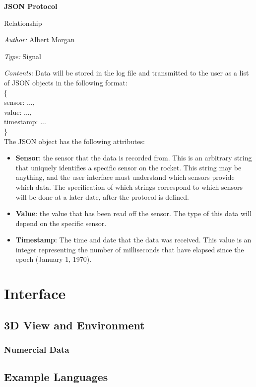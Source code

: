 \documentclass[10pt,draftclsnofoot,onecolumn]{IEEEtran}
\newcommand{\newrelationship}[4]{
	\begin{minipage}{\linewidth}
	\noindent\textbf{#2}
	
	\noindent Relationship
	
	\noindent\textit{Author:} #1

	\noindent\textit{Type:} #3

	\noindent\textit{Contents:} #4
	\vspace{.5cm}
	\end{minipage}
}
\begin{document}
	\newrelationship
	{Albert Morgan}
	{JSON Protocol}
	{Signal}
	{
		Data will be stored in the log file and transmitted to the user as a list of JSON objects in the following format:\\

\noindent\{\\
sensor: ...,\\
value: ...,\\
timestamp: ...\\
\}\\

		The JSON object has the following attributes:
		\begin{itemize}
			\item\textbf{Sensor}: the sensor that the data is recorded from.
			This is an arbitrary string that uniquely identifies a specific sensor on the rocket.
			This string may be anything, and the user interface must understand which sensors provide which data.
			The specification of which strings correspond to which sensors will be done at a later date, after the protocol is defined.
			\item\textbf{Value}: the value that has been read off the sensor.
			The type of this data will depend on the specific sensor.
			\item\textbf{Timestamp}: The time and date that the data was received.
			This value is an integer representing the number of milliseconds that have elapsed since the epoch (January 1, 1970).
		\end{itemize}
	}
	

	
	\section{Interface}

	\subsection{3D View and Environment}

	\subsubsection{Numercial Data}

	\subsection{Example Languages}
\end{document}
